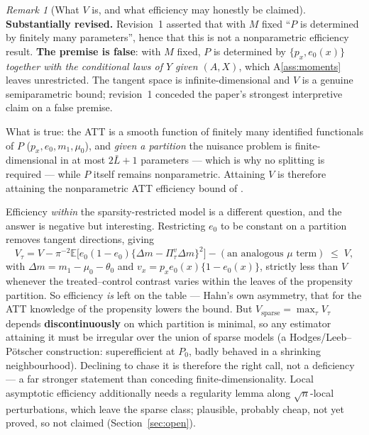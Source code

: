 \documentclass[11pt]{article}
\theoremstyle{plain}
\theoremstyle{definition}
\theoremstyle{remark}
\newtheorem{remark}{Remark}
\newcommand{\E}{\mathbb{E}}
\newcommand{\ez}{e_0}
\newcommand{\mz}{\mu_0}
\begin{document}
\begin{remark}[What $V$ is, and what efficiency may honestly be claimed]
\label{rem:efficiency}
\textbf{Substantially revised.} Revision~1 asserted that with $M$ fixed ``$P$ is
determined by finitely many parameters'', hence that this is not a nonparametric
efficiency result. \textbf{The premise is false}: with $M$ fixed, $P$ is
determined by $\{p_x,\ez(x)\}$ \emph{together with the conditional laws of $Y$
given $(A,X)$}, which A\ref{ass:moments} leaves unrestricted. The tangent space is
infinite-dimensional and $V$ is a genuine semiparametric bound; revision~1
conceded the paper's strongest interpretive claim on a false premise.

What is true: the ATT is a smooth function of finitely many identified
functionals of $P$ ($p_x,\ez,m_1,\mz$), and \emph{given a partition} the nuisance
problem is finite-dimensional in at most $2\bar L+1$ parameters --- which is why
no splitting is required --- while $P$ itself remains nonparametric. Attaining $V$
is therefore attaining the nonparametric ATT efficiency bound of
\citet{hahn1998}.

Efficiency \emph{within} the sparsity-restricted model is a different question,
and the answer is negative but interesting. Restricting $\ez$ to be constant on a
partition removes tangent directions, giving
\[
 V_\tau=V-\pi^{-2}\E\bigl[\ez(1-\ez)\{\Delta m-\Pi^v_\tau\Delta m\}^2\bigr]
  -(\text{an analogous }\mu\text{ term})\;\le\;V,
\]
with $\Delta m=m_1-\mz-\theta_0$ and $v_x=p_x\ez(x)\{1-\ez(x)\}$, strictly less
than $V$ whenever the treated--control contrast varies within the leaves of the
propensity partition. So efficiency \emph{is} left on the table --- Hahn's own
asymmetry, that for the ATT knowledge of the propensity lowers the bound. But
$V_{\mathrm{sparse}}=\max_\tau V_\tau$ depends \textbf{discontinuously} on which
partition is minimal, so any estimator attaining it must be irregular over the
union of sparse models (a Hodges/Leeb--P\"otscher construction: superefficient at
$P_0$, badly behaved in a shrinking neighbourhood). Declining to chase it is
therefore the right call, not a deficiency --- a far stronger statement than
conceding finite-dimensionality. Local asymptotic efficiency additionally needs a
regularity lemma along $\sqrt n$-local perturbations, which leave the sparse
class; plausible, probably cheap, not yet proved, so not claimed
(Section~\ref{sec:open}).
\end{remark}
\end{document}
